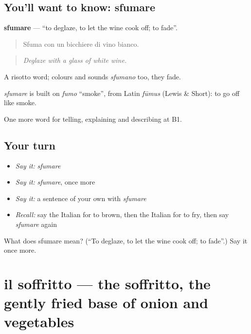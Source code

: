 \subsection*{You'll want to know: sfumare}
\textbf{sfumare} — \textquotedblleft{}to deglaze, to let the wine cook off; to fade\textquotedblright{}.

\begin{quote}
Sfuma con un bicchiere di vino bianco.
\end{quote}

\begin{quote}
\emph{Deglaze with a glass of white wine.}
\end{quote}

A risotto word; colours and sounds \emph{sfumano} too, they fade.

\begin{cousinweb}
\emph{sfumare} is built on \emph{fumo} \textquotedblleft{}smoke\textquotedblright{}, from Latin \emph{fūmus} (Lewis \& Short): to go off like smoke.
\end{cousinweb}

\begin{grammarlens}[title={What you've built}]
One more word for telling, explaining and describing at B1.
\end{grammarlens}

\subsection*{Your turn}
\begin{itemize}
\raggedright
  \item \emph{Say it:} \emph{sfumare}
  \item \emph{Say it:} \emph{sfumare}, once more
  \item \emph{Say it:} a sentence of your own with \emph{sfumare}
  \item \emph{Recall:} say the Italian for to brown, then the Italian for to fry, then say \emph{sfumare} again
\end{itemize}

\begin{tcolorbox}[breakable,colback=teal!4,colframe=teal!35!black,title={Before you move on}]
What does sfumare mean? (\textquotedblleft{}To deglaze, to let the wine cook off; to fade\textquotedblright{}.) Say it once more.
\end{tcolorbox}
\section[il soffritto]{il soffritto — the soffritto, the gently fried base of onion and vegetables}

